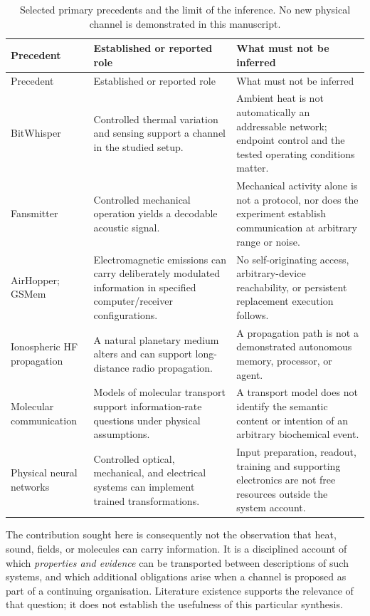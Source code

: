 \documentclass[11pt,a4paper]{article}
\theoremstyle{definition}
\theoremstyle{remark}
\begin{document}
\begin{longtable}{@{}>{\raggedright\arraybackslash}p{}>{\raggedright\arraybackslash}p{}>{\raggedright\arraybackslash}p{}@{}}
\caption{Selected primary precedents and the limit of the inference. No new physical channel is demonstrated in this manuscript.}\label{tab:priorart}\\
\toprule
Precedent & Established or reported role & What must not be inferred \\\midrule
\endfirsthead
\toprule Precedent & Established or reported role & What must not be inferred \\\midrule
\endhead
BitWhisper \citep{bitwhisper} & Controlled thermal variation and sensing support a channel in the studied setup. & Ambient heat is not automatically an addressable network; endpoint control and the tested operating conditions matter. \\\addlinespace
Fansmitter \citep{fansmitter} & Controlled mechanical operation yields a decodable acoustic signal. & Mechanical activity alone is not a protocol, nor does the experiment establish communication at arbitrary range or noise. \\\addlinespace
AirHopper; GSMem \citep{airhopper,gsmem} & Electromagnetic emissions can carry deliberately modulated information in specified computer/receiver configurations. & No self-originating access, arbitrary-device reachability, or persistent replacement execution follows. \\\addlinespace
Ionospheric HF propagation \citep{noaa} & A natural planetary medium alters and can support long-distance radio propagation. & A propagation path is not a demonstrated autonomous memory, processor, or agent. \\\addlinespace
Molecular communication \citep{eckford} & Models of molecular transport support information-rate questions under physical assumptions. & A transport model does not identify the semantic content or intention of an arbitrary biochemical event. \\\addlinespace
Physical neural networks \citep{wright} & Controlled optical, mechanical, and electrical systems can implement trained transformations. & Input preparation, readout, training and supporting electronics are not free resources outside the system account. \\
\bottomrule
\end{longtable}

The contribution sought here is consequently not the observation that heat, sound, fields, or molecules can carry information. It is a disciplined account of which \emph{properties and evidence} can be transported between descriptions of such systems, and which additional obligations arise when a channel is proposed as part of a continuing organisation. Literature existence supports the relevance of that question; it does not establish the usefulness of this particular synthesis.
\end{document}
